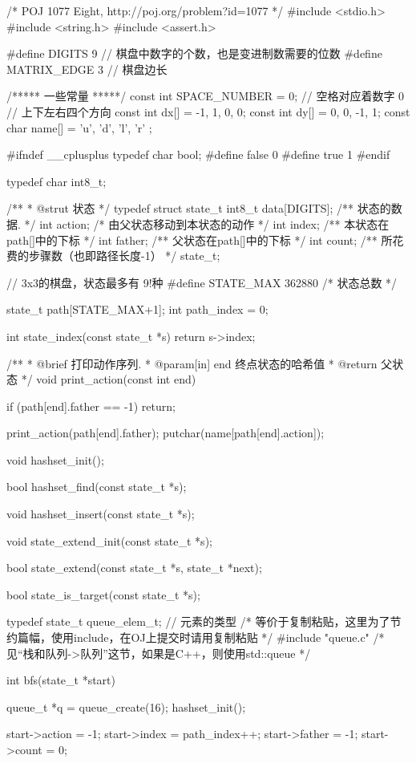 \begin{Codex}[label=eight_digits_bfs2.c]
/* POJ 1077 Eight, http://poj.org/problem?id=1077 */
#include <stdio.h>
#include <string.h>
#include <assert.h>

#define DIGITS 9 // 棋盘中数字的个数，也是变进制数需要的位数
#define     MATRIX_EDGE 3       // 棋盘边长

/***** 一些常量 *****/
const int SPACE_NUMBER = 0; // 空格对应着数字 0
// 上下左右四个方向
const int dx[] = {-1, 1, 0, 0};
const int dy[] = {0, 0, -1, 1};
const char name[] = { 'u', 'd', 'l', 'r' };

#ifndef __cplusplus
typedef char bool;
#define false 0
#define true 1
#endif

typedef char int8_t;

/**
 * @strut 状态
 */
typedef struct state_t {
    int8_t data[DIGITS];  /** 状态的数据. */
    int action; /* 由父状态移动到本状态的动作 */
    int index;  /** 本状态在path[]中的下标 */
    int father; /** 父状态在path[]中的下标 */
    int count;  /** 所花费的步骤数（也即路径长度-1） */
} state_t;

// 3x3的棋盘，状态最多有 9!种
#define STATE_MAX 362880  /* 状态总数 */

state_t path[STATE_MAX+1];
int path_index = 0;

int state_index(const state_t *s) {
    return s->index;
}

/**
 * @brief 打印动作序列.
 * @param[in] end 终点状态的哈希值
 * @return 父状态
 */
void print_action(const int end) {
    if (path[end].father == -1) return;

    print_action(path[end].father);
    putchar(name[path[end].action]);
}

void hashset_init();

bool hashset_find(const state_t *s);

void hashset_insert(const state_t *s);

void state_extend_init(const state_t *s);

bool state_extend(const state_t *s, state_t *next);

bool state_is_target(const state_t *s);

typedef state_t queue_elem_t; // 元素的类型
/* 等价于复制粘贴，这里为了节约篇幅，使用include，在OJ上提交时请用复制粘贴 */
#include "queue.c"  /* 见“栈和队列->队列”这节，如果是C++，则使用std::queue */

int bfs(state_t *start) {
    queue_t *q = queue_create(16);
    hashset_init();

    start->action = -1;
    start->index = path_index++;
    start->father = -1;
    start->count = 0;

}
\end{Codex}
